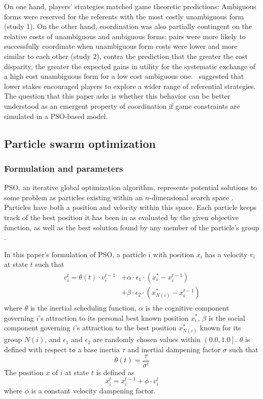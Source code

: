 \documentclass[a4paper,11pt]{article}
\begin{document}
On one hand, players' strategies matched game theoretic predictions: Ambiguous forms were reserved for the referents with the most costly unambiguous form (study 1).  On the other hand, coordination was also partially contingent on the relative costs of unambiguous and ambiguous forms: pairs were more likely to successfully coordinate when unambiguous form costs were lower and more similar to each other (study 2), contra the prediction that the greater the cost disparity, the greater the expected gains in utility for the systematic exchange of a high cost unambiguous form for a low cost ambiguous one. \citeauthor{rohde2012}\ suggested that lower stakes encouraged players to explore a wider range of referential strategies. The question that this paper asks is whether this behavior can be better understood as an emergent property of coordination if game constraints are simulated in a PSO-based model.


\subsection{Particle swarm optimization}
\subsubsection{Formulation and parameters}
\label{sec:2.2.3}
PSO, an iterative global optimization algorithm, represents potential solutions to some problem as particles existing within an $n$-dimensional search space \cite{kennedy1995}. Particles have both a position and velocity within this space. Each particle keeps track of the best position it has been in as evaluated by the given objective function, as well as the best solution found by any member of the particle's group \cite{chong2013}. 

In this paper's formulation of PSO, a particle $i$ with position $x_i$ has a velocity $v_i$ at state $t$ such that 
\begin{multline}
\begin{split}
v_i^t = \theta(t) \cdot v_i^{t-1} & + \alpha \cdot \epsilon_1 \cdot (x_i^* - x_i^{t-1}) \\
                                  & + \beta \cdot \epsilon_2 \cdot (x_{N(i)}^* - x_i^{t-1})
\end{split}
\end{multline}
where $\theta$ is the inertial scheduling function, $\alpha$ is the cognitive component governing $i$'s attraction to its personal best known position $x_i^*$, $\beta$ is the social component governing $i$'s attraction to the best position $x_{N(i)}^*$ known for its group $N(i)$, and $\epsilon_1$ and $\epsilon_2$ are randomly chosen values within $\left(0.0, 1.0\right]$. $\theta$ is defined with respect to a base inertia $\tau$ and inertial dampening factor $\sigma$ such that
\begin{equation}
\theta(t) = \frac{\tau}{\sigma^t} 
\end{equation}
The position $x$ of $i$ at state $t$ is defined as
\begin{equation}
x_i^t = x_i^{t-1} + \phi \cdot v_i^t 
\end{equation}
where $\phi$ is a constant velocity dampening factor.
\end{document}
